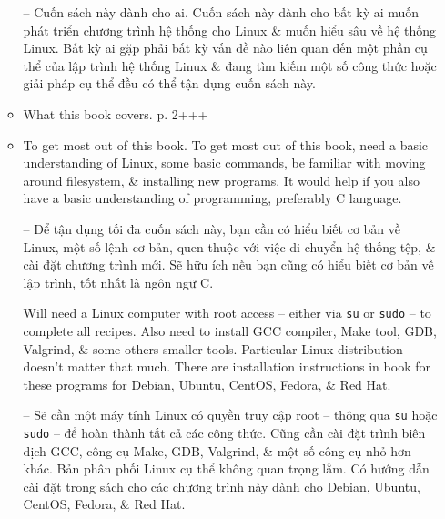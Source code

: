 \documentclass{article}
\begin{document}
\begin{itemize}
\begin{itemize}
        -- {\sf Cuốn sách này dành cho ai.} Cuốn sách này dành cho bất kỳ ai muốn phát triển chương trình hệ thống cho Linux \& muốn hiểu sâu về hệ thống Linux. Bất kỳ ai gặp phải bất kỳ vấn đề nào liên quan đến một phần cụ thể của lập trình hệ thống Linux \& đang tìm kiếm một số công thức hoặc giải pháp cụ thể đều có thể tận dụng cuốn sách này.
        \item {\sf What this book covers.} p. 2+++
        \item {\sf To get most out of this book.} To get most out of this book, need a basic understanding of Linux, some basic commands, be familiar with moving around filesystem, \& installing new programs. It would help if you also have a basic understanding of programming, preferably C language.
        
        -- Để tận dụng tối đa cuốn sách này, bạn cần có hiểu biết cơ bản về Linux, một số lệnh cơ bản, quen thuộc với việc di chuyển hệ thống tệp, \& cài đặt chương trình mới. Sẽ hữu ích nếu bạn cũng có hiểu biết cơ bản về lập trình, tốt nhất là ngôn ngữ C.
        
        Will need a Linux computer with root access -- either via {\tt su} or {\tt sudo} -- to complete all recipes. Also need to install GCC compiler, Make tool, GDB, Valgrind, \& some others smaller tools. Particular Linux distribution doesn't matter that much. There are installation instructions in book for these programs for Debian, Ubuntu, CentOS, Fedora, \& Red Hat.
        
        -- Sẽ cần một máy tính Linux có quyền truy cập root -- thông qua {\tt su} hoặc {\tt sudo} -- để hoàn thành tất cả các công thức. Cũng cần cài đặt trình biên dịch GCC, công cụ Make, GDB, Valgrind, \& một số công cụ nhỏ hơn khác. Bản phân phối Linux cụ thể không quan trọng lắm. Có hướng dẫn cài đặt trong sách cho các chương trình này dành cho Debian, Ubuntu, CentOS, Fedora, \& Red Hat.
        

\end{itemize}
\end{itemize}
\end{document}
